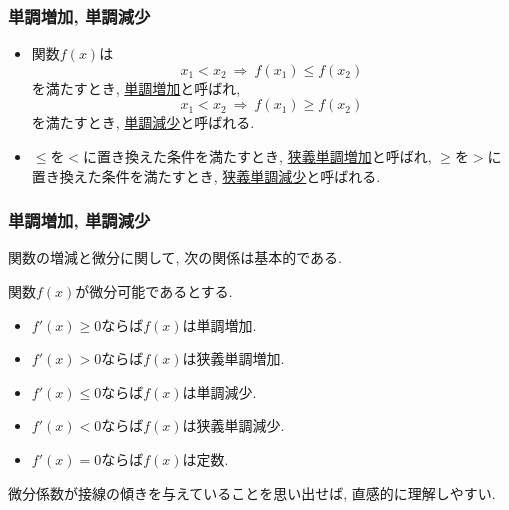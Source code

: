 \begin{frame}
\frametitle{単調増加, 単調減少}


\begin{Def}
\begin{itemize}
\item 関数$f(x)$は
$$
x_1 < x_2 \ \Rightarrow \ f(x_1)  \le f(x_2)
$$
を満たすとき, \underline{単調増加}と呼ばれ, 
$$
x_1 < x_2 \ \Rightarrow \ f(x_1)  \ge f(x_2)
$$
を満たすとき, \underline{単調減少}と呼ばれる. 
\item $\le$を$<$に置き換えた条件を満たすとき, \underline{狭義単調増加}と呼ばれ, 
$\ge$を$>$に置き換えた条件を満たすとき, \underline{狭義単調減少}と呼ばれる. 
\end{itemize}
\end{Def}




\end{frame}





\begin{frame}
\frametitle{単調増加, 単調減少}


関数の増減と微分に関して, 次の関係は基本的である. 

\begin{Thm}
関数$f(x)$が微分可能であるとする. 
\begin{itemize}
\item $f'(x)\ge0$ならば$f(x)$は単調増加. 
\item $f'(x)>0$ならば$f(x)$は狭義単調増加. 
\item $f'(x)\le0$ならば$f(x)$は単調減少. 
\item $f'(x)<0$ならば$f(x)$は狭義単調減少. 
\item $f'(x)=0$ならば$f(x)$は定数. 
\end{itemize}
\end{Thm}
微分係数が接線の傾きを与えていることを思い出せば, 直感的に理解しやすい. 


\end{frame}





